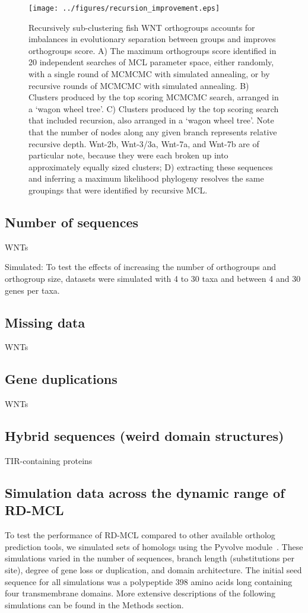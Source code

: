 \documentclass[twocolumn]{bmcart}  %
\begin{document}
\begin{figure}[t]
  \begin{center}
  \texttt{[image: ../figures/recursion\_improvement.eps]}
\end{center}
\caption{Recursively sub-clustering fish WNT orthogroups accounts for imbalances in evolutionary separation between groups and improves orthogroups score. A) The maximum orthogroups score identified in 20 independent searches of MCL parameter space, either randomly, with a single round of MCMCMC with simulated annealing, or by recursive rounds of MCMCMC with simulated annealing. B) Clusters produced by the top scoring MCMCMC search, arranged in a `wagon wheel tree'. C) Clusters produced by the top scoring search that included recursion, also arranged in a `wagon wheel tree'. Note that the number of nodes along any given branch represents relative recursive depth. Wnt-2b, Wnt-3/3a, Wnt-7a, and Wnt-7b are of particular note, because they were each broken up into approximately equally sized clusters; D) extracting these sequences and inferring a maximum likelihood phylogeny   resolves the same groupings that were identified by recursive MCL.}
\label{fig:recursion_improvement}
\end{figure}


\subsection{Number of sequences}
WNTs

Simulated: To test the effects of increasing the number of orthogroups and orthogroup size, datasets were simulated with 4 to 30 taxa and between 4 and 30 genes per taxa.


\subsection{Missing data}
WNTs


\subsection{Gene duplications}
WNTs


\subsection{Hybrid sequences (weird domain structures)}
TIR-containing proteins


\subsection{Simulation data across the dynamic range of RD-MCL}\label{subsec:simulationDataAcrossTheDynamicRangeOfRd-mcl}
To test the performance of RD-MCL compared to other available ortholog prediction tools, we simulated sets of homologs using the Pyvolve module~\cite{Spielman:2015kv}.
These simulations varied in the number of sequences, branch length (substitutions per site), degree of gene loss or duplication, and domain architecture.
The initial seed sequence for all simulations was a polypeptide 398 amino acids long containing four transmembrane domains.
More extensive descriptions of the following simulations can be found in the Methods section.
\end{document}
